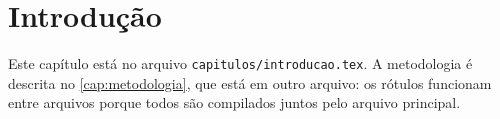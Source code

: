 \chapter{Introdução}\label{cap:introducao}

Este capítulo está no arquivo \texttt{capitulos/introducao.tex}. A
metodologia é descrita no \autoref{cap:metodologia}, que está em outro
arquivo: os rótulos funcionam entre arquivos porque todos são compilados
juntos pelo arquivo principal.
